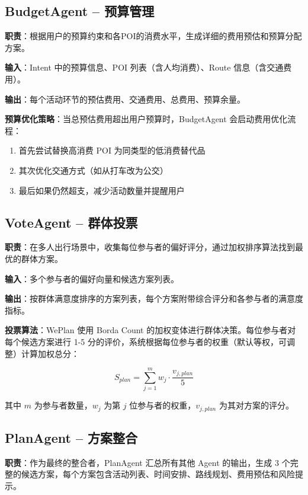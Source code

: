 \documentclass[12pt,a4paper]{ctexart}
\begin{document}
\subsection{BudgetAgent -- 预算管理}

\textbf{职责}：根据用户的预算约束和各POI的消费水平，生成详细的费用预估和预算分配方案。

\textbf{输入}：Intent 中的预算信息、POI 列表（含人均消费）、Route 信息（含交通费用）。

\textbf{输出}：每个活动环节的预估费用、交通费用、总费用、预算余量。

\textbf{预算优化策略}：当总预估费用超出用户预算时，BudgetAgent 会启动费用优化流程：
\begin{enumerate}[leftmargin=2em]
  \item 首先尝试替换高消费 POI 为同类型的低消费替代品
  \item 其次优化交通方式（如从打车改为公交）
  \item 最后如果仍然超支，减少活动数量并提醒用户
\end{enumerate}

\subsection{VoteAgent -- 群体投票}

\textbf{职责}：在多人出行场景中，收集每位参与者的偏好评分，通过加权排序算法找到最优的群体方案。

\textbf{输入}：多个参与者的偏好向量和候选方案列表。

\textbf{输出}：按群体满意度排序的方案列表，每个方案附带综合评分和各参与者的满意度指标。

\textbf{投票算法}：WePlan 使用 Borda Count 的加权变体进行群体决策。每位参与者对每个候选方案进行 1-5 分的评价，系统根据每位参与者的权重（默认等权，可调整）计算加权总分：

\begin{equation}
S_{plan} = \sum_{j=1}^{m} w_j \cdot \frac{v_{j,plan}}{5}
\end{equation}

其中 $m$ 为参与者数量，$w_j$ 为第 $j$ 位参与者的权重，$v_{j,plan}$ 为其对方案的评分。

\subsection{PlanAgent -- 方案整合}

\textbf{职责}：作为最终的整合者，PlanAgent 汇总所有其他 Agent 的输出，生成 3 个完整的候选方案，每个方案包含活动列表、时间安排、路线规划、费用预估和风险提示。
\end{document}
